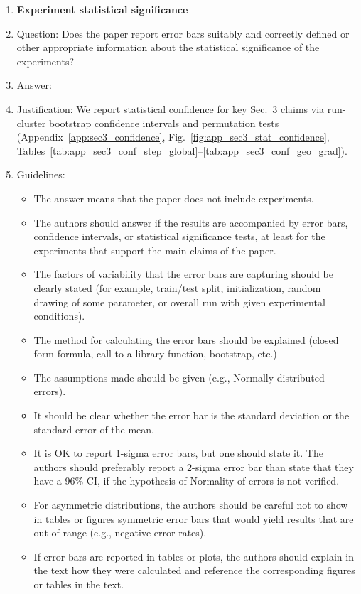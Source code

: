 \documentclass{article}
\begin{document}
\begin{enumerate}
\item {\bf Experiment statistical significance}
    \item[] Question: Does the paper report error bars suitably and correctly defined or other appropriate information about the statistical significance of the experiments?
    \item[] Answer: \answerYes{} %
    \item[] Justification: We report statistical confidence for key Sec.~3 claims via run-cluster bootstrap confidence intervals and permutation tests (Appendix~\ref{app:sec3_confidence}, Fig.~\ref{fig:app_sec3_stat_confidence}, Tables~\ref{tab:app_sec3_conf_step_global}--\ref{tab:app_sec3_conf_geo_grad}).
    \item[] Guidelines:
    \begin{itemize}
        \item The answer \answerNA{} means that the paper does not include experiments.
        \item The authors should answer \answerYes{} if the results are accompanied by error bars, confidence intervals, or statistical significance tests, at least for the experiments that support the main claims of the paper.
        \item The factors of variability that the error bars are capturing should be clearly stated (for example, train/test split, initialization, random drawing of some parameter, or overall run with given experimental conditions).
        \item The method for calculating the error bars should be explained (closed form formula, call to a library function, bootstrap, etc.)
        \item The assumptions made should be given (e.g., Normally distributed errors).
        \item It should be clear whether the error bar is the standard deviation or the standard error of the mean.
        \item It is OK to report 1-sigma error bars, but one should state it. The authors should preferably report a 2-sigma error bar than state that they have a 96\% CI, if the hypothesis of Normality of errors is not verified.
        \item For asymmetric distributions, the authors should be careful not to show in tables or figures symmetric error bars that would yield results that are out of range (e.g., negative error rates).
        \item If error bars are reported in tables or plots, the authors should explain in the text how they were calculated and reference the corresponding figures or tables in the text.
    \end{itemize}


\end{enumerate}
\end{document}
